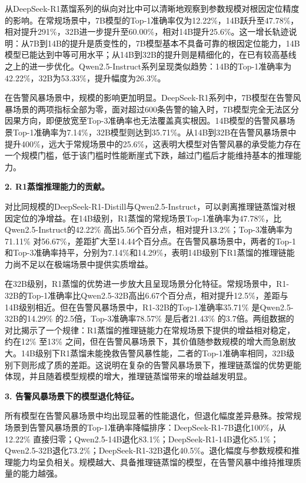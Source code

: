 从DeepSeek-R1蒸馏系列的纵向对比中可以清晰地观察到参数规模对根因定位精度的影响。在常规场景中，7B模型的Top-1准确率仅为12.22\%，14B跃升至47.78\%，相对提升291\%，32B进一步提升至60.00\%，相对14B提升25.6\%。这一增长轨迹说明：从7B到14B的提升是质变性的，7B模型基本不具备可靠的根因定位能力，14B模型已能达到中等可用水平；从14B到32B的提升则是精细化的，在已有较高基线之上的进一步优化。Qwen2.5-Instruct系列呈现类似趋势：14B的Top-1准确率为42.22\%，32B为53.33\%，提升幅度为26.3\%。

在告警风暴场景中，规模的影响更加明显。DeepSeek-R1系列中，7B模型在告警风暴场景的两项指标全部为零，面对超过600条告警的输入时，7B模型完全无法区分因果方向，即便放宽至Top-3准确率也无法覆盖真实根因。14B模型的告警风暴场景Top-1准确率为7.14\%，32B模型则达到35.71\%。从14B到32B在告警风暴场景中提升400\%，远大于常规场景中的25.6\%，这表明大模型对告警风暴的承受能力存在一个规模门槛，低于该门槛时性能断崖式下跌，越过门槛后才能维持基本的推理能力。

\textbf{2. R1蒸馏推理能力的贡献。}

对比同规模的DeepSeek-R1-Distill与Qwen2.5-Instruct，可以剥离推理链蒸馏对根因定位的净增益。在14B级别，R1蒸馏的常规场景Top-1准确率为47.78\%，比Qwen2.5-Instruct的42.22\% 高出5.56个百分点，相对提升13.2\%；Top-3准确率为71.11\% 对56.67\%，差距扩大至14.44个百分点。在告警风暴场景中，两者的Top-1和Top-3准确率持平，分别为7.14\%和14.29\%，表明14B级别下R1蒸馏的推理链能力尚不足以在极端场景中提供实质增益。

在32B级别，R1蒸馏的优势进一步放大且呈现场景分化特征。常规场景中，R1-32B的Top-1准确率比Qwen2.5-32B高出6.67个百分点，相对提升12.5\%，差距与14B级别相近。但在告警风暴场景中，R1-32B的Top-1准确率35.71\% 是Qwen2.5-32B的14.29\% 的2.5倍，Top-3准确率78.57\% 是后者21.43\% 的3.7倍。两组数据的对比揭示了一个规律：R1蒸馏的推理链能力在常规场景下提供的增益相对稳定，约在12\% 至13\% 之间，但在告警风暴场景下，其价值随参数规模的增大而急剧放大。14B级别下R1蒸馏未能挽救告警风暴性能，二者的Top-1准确率相同，32B级别下则形成了质的差距。这说明在复杂的告警风暴场景下，推理链蒸馏的优势更能体现，并且随着模型规模的增大，推理链蒸馏带来的增益越发明显。

\textbf{3. 告警风暴场景下的模型退化特征。}

所有模型在告警风暴场景中均出现显著的性能退化，但退化幅度差异悬殊。按常规场景到告警风暴场景的Top-1准确率降幅排序：DeepSeek-R1-7B退化100\%，从12.22\% 直接归零；Qwen2.5-14B退化83.1\%；DeepSeek-R1-14B退化85.1\%；Qwen2.5-32B退化73.2\%；DeepSeek-R1-32B退化40.5\%。退化幅度与参数规模和推理能力均呈负相关。规模越大、具备推理链蒸馏的模型，在告警风暴中维持推理质量的能力越强。

